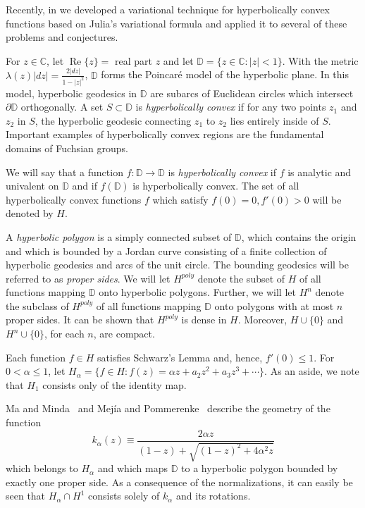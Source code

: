 \documentclass{cmft}
\newcommand{\C}{\mathbb{C}}
\newcommand{\D}{\mathbb{D}}
\newcommand{\al}{\alpha}
\DeclareMathOperator{\re}{Re}
\begin{document}
Recently, in \cite{bcpw,bop} we developed a variational technique
 for hyperbolically convex functions based on
Julia's variational formula
and applied it to several of these problems and conjectures.

For $z \in \C$, let $\re\{z\} =$ real part $z$ and 
let $\D = \{ z \in \C : |z| < 1 \}$. 
With the metric ${\lambda(z)|dz| =
\frac{2|dz|}{1 - |z|^2}}$, $\D$ forms the Poincar\'e model of the hyperbolic
plane.
In this model, hyperbolic geodesics in $\D$ are
subarcs of Euclidean circles which intersect $\partial \D$
 orthogonally.  A set
$S \subset \D$ is {\it hyperbolically convex} if for any two points $z_1$ and
$z_2$ in $S$, the hyperbolic geodesic connecting $z_1$ to $z_2$ lies entirely
inside of $S$.
Important examples of hyperbolically convex regions
are the fundamental domains of Fuchsian groups.

We will say that a function $f : \D \rightarrow \D$ is {\it hyperbolically
convex} if $f$ is analytic and univalent on $\D$ and if $f(\D)$ is hyperbolically
convex.  The set of all hyperbolically convex functions $f$ which satisfy $f(0) =
0, f'(0) > 0$ will be denoted by $H$. 


A {\it hyperbolic polygon} is a simply connected subset of $\D$, which contains
the origin and which is bounded by a Jordan curve consisting of a finite
collection of hyperbolic geodesics  and arcs of the unit circle.  The 
bounding geodesics  will be referred to as {\it proper sides}.  We will let
$H^{poly}$ denote the subset of $H$ of all functions mapping $\D$ onto hyperbolic
polygons.  Further, we will let $H^n$ denote the subclass of $H^{poly}$ of all
functions mapping $\D$ onto polygons with at most $n$ proper sides.  It 
can be shown that
 $H^{poly}$ is dense in $H$.  Moreover, $H \cup \{0\}$ and $H^n \cup
\{0\}$, for each $n$, are compact.

Each function $f \in H$ satisfies Schwarz's Lemma and, hence, $f'(0) \le
1$.  For $0 < \al \le 1$, let $H_{\al} = \{f \in H : f(z) = \al z + a_2z^2 +
a_3z^3 + \cdots \}$.  
As an aside, we note that $H_1$ consists only of the identity map.

Ma and Minda~\cite{MM94,MM99} and  Mej\'ia and Pommerenke~\cite{PM00}
 describe the
geometry of the function
$$k_{\al}(z) \equiv \frac{2\al z}{(1-z)+ \sqrt{(1-z)^2 + 4\al^2z}}$$ which
belongs to $H_{\al}$ and which maps $\D$ to a hyperbolic polygon bounded by
exactly one proper side. As a consequence of the normalizations, it can 
easily be
seen that $H_{\al} \cap H^1$ consists solely of $k_{\al}$ and its rotations.
\end{document}
